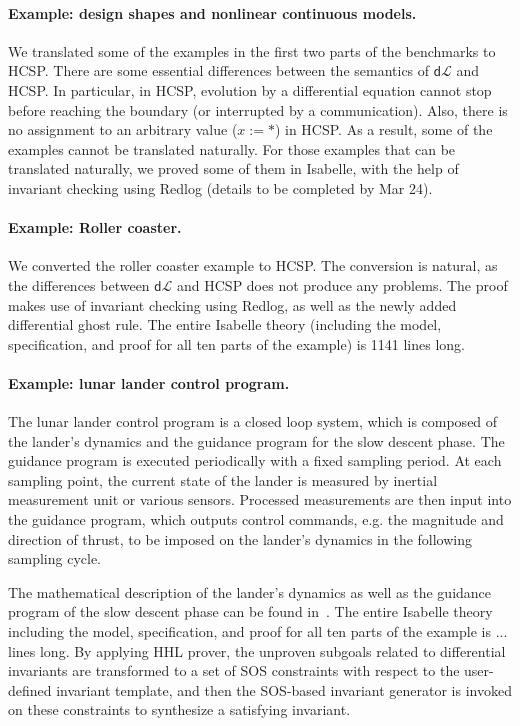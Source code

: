 \documentclass[runningheads,a4paper]{llncs}
\newcommand{\dL}{\mathsf{d}\mathcal{L}}
\begin{document}
\paragraph{Example: design shapes and nonlinear continuous models.}

We translated some of the examples in the first two parts of the
benchmarks to HCSP. There are some essential differences between the
semantics of $\dL$ and HCSP. In particular, in HCSP, evolution by a
differential equation cannot stop before reaching the boundary (or
interrupted by a communication). Also, there is no assignment to an
arbitrary value ($x := *$) in HCSP. As a result, some of the examples
cannot be translated naturally. For those examples that can be
translated naturally, we proved some of them in Isabelle, with the
help of invariant checking using Redlog (details to be completed by
Mar 24).

\paragraph{Example: Roller coaster.}

We converted the roller coaster example \cite{coasterx} to HCSP. The
conversion is natural, as the differences between $\dL$ and HCSP does
not produce any problems. The proof makes use of invariant checking
using Redlog, as well as the newly added differential ghost rule. The
entire Isabelle theory (including the model, specification, and proof
for all ten parts of the example) is 1141 lines long.

\paragraph{Example: lunar lander control program.}

The lunar lander control program is a closed loop system, which is
composed of the lander's dynamics and the guidance program for the
slow descent phase. The guidance program is executed periodically with
a fixed sampling period. At each sampling point, the current state of
the lander is measured by inertial measurement unit or various
sensors. Processed measurements are then input into the guidance
program, which outputs control commands, e.g. the magnitude and
direction of thrust, to be imposed on the lander's dynamics in the
following sampling cycle.

The mathematical description of the lander's dynamics as well as the
guidance program of the slow descent phase can be found
in~\cite{ZYZG14,ZhanWZ16}. The entire Isabelle theory including the
model, specification, and proof for all ten parts of the example is
... lines long.  By applying HHL prover, the unproven subgoals related
to differential invariants are transformed to a set of SOS constraints
with respect to the user-defined invariant template, and then the
SOS-based invariant generator is invoked on these constraints to
synthesize a satisfying invariant.





\end{document}

